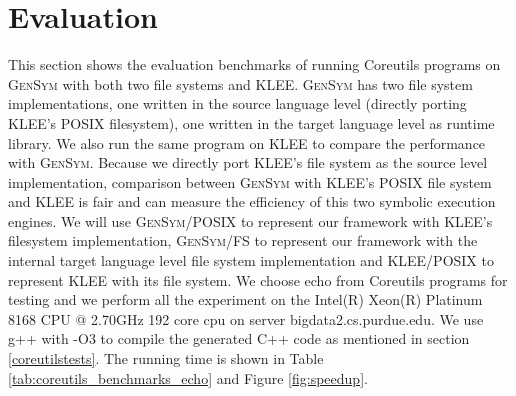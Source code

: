 \documentclass[sigplan, nonacm]{acmart}\settopmatter{printfolios=true,printccs=false,printacmref=false}
\newcommand{\tool}{\textsc{GenSym}\xspace}
\begin{document}
\section{Evaluation}\label{evaluation}
This section shows the evaluation benchmarks of running Coreutils programs on \tool with both two file systems and KLEE. \tool has two file system implementations, one written in the source language level (directly porting KLEE's POSIX filesystem), one written in the target language level as runtime library. We also run the same program on KLEE to compare the performance with \tool. Because we directly port KLEE's file system as the source level implementation, comparison between \tool with KLEE's POSIX file system and KLEE is fair and can measure the efficiency of this two symbolic execution engines. We will use \tool/POSIX to represent our framework with KLEE's filesystem implementation, \tool/FS to represent our framework with the internal target language level file system implementation and KLEE/POSIX to represent KLEE with its file system. We choose echo from Coreutils programs for testing and we perform all the experiment on the Intel(R) Xeon(R) Platinum 8168 CPU @ 2.70GHz 192 core cpu on server bigdata2.cs.purdue.edu. We use g++ with -O3 to compile the generated C++ code as mentioned in section \ref{coreutilstests}. The running time is shown in Table \ref{tab:coreutils_benchmarks_echo} and Figure \ref{fig:speedup}.\par
\end{document}
